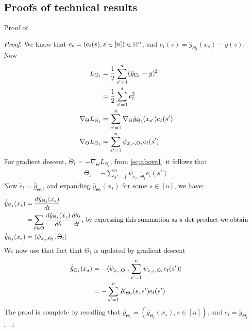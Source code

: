 \begin{appendix}
\section{Proofs of technical results}
Proof of 
\begin{proof}
We know that $e_t=(e_t(s),s\in[n])\in\mathbb{R}^n$, and $e_t(s)=\hat{y}_{\Theta_t}(x_s)-y(s)$. Now
\begin{align} 
L_{\Theta_t}&=\frac{1}2\sum_{s'=1}^n(\hat{y}_{\Theta_t}-y)^2\nonumber\\
&=\frac{1}2\sum_{s'=1}^n e_t^2\nonumber\\
\nabla_{\Theta} L_{\Theta_t}&= \sum_{s'=1}^n\nabla_{\Theta} \hat{y}_{\Theta_t}(x_{s'})e_t(s')\nonumber\\
\label{eq:above1} \nabla_{\Theta} L_{\Theta_t}&= \sum_{s'=1}^n \psi_{x_{s'},\Theta_t}e_t(s')
\end{align}
For gradient descent, $\dot{\Theta}_t=-\nabla_{\Theta} L_{\Theta_t}$, from \eqref{eq:above1} it follows that 
\begin{align}
\dot{\Theta}_t=-\sum_{s'=1}^n \psi_{x_{s'},\Theta_t}e_t(s')
\end{align}
Now $\dot{e}_t=\dot{\hat{y}}_{\Theta_t}$, and expanding $\dot{\hat{y}}_{\Theta_t}(x_s)$ for some $s\in[n]$, we have:
\begin{align}
\dot{\hat{y}}_{\Theta_t}(x_s)&=\frac{d \hat{y}_{\Theta_t}(x_s)}{d t}\nonumber\\
&=\sum_{\theta\in\Theta}\frac{d \hat{y}_{\Theta_t}(x_s)}{d \theta}\frac{d \theta_t}{dt},\,\text{by expressing this summation as a dot product we obtain} \nonumber\\
\dot{\hat{y}}_{\Theta_t}(x_s)&=\langle \psi_{x_s,\Theta_t},\dot{\Theta}_t\rangle
\end{align}
We now use that fact that $\Theta_t$ is updated by gradient descent
\begin{align}
\dot{\hat{y}}_{\Theta_t}(x_s)&=-\langle \psi_{x_s,\Theta_t},\sum_{s'=1}^n \psi_{x_{s'},\Theta_t}e_t(s')\rangle\nonumber\\
&=-\sum_{s'=1}^n K_{\Theta_t}(s,s')e_t(s')
\end{align}
The proof is complete by recalling that $\hat{y}_{\Theta_t}=(\hat{y}_{\Theta_t}(x_s),s\in[n])$, and $\dot{e}_t=\dot{\hat{y}}_{\Theta_t}$.
\end{proof}



\end{appendix}
